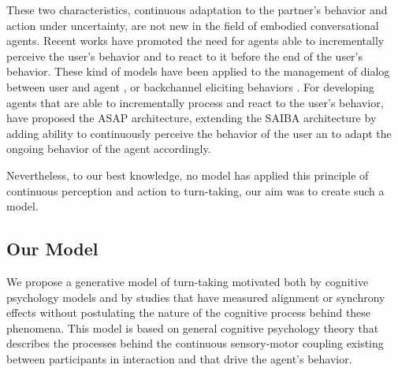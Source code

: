  These two characteristics, continuous adaptation to the partner's behavior and action under uncertainty, are not new in the field of embodied conversational agents. Recent works have promoted the need for agents able to incrementally perceive the user's behavior and to react to it before the end of the user's behavior. These kind of models have been applied to the management of dialog between user and agent \cite{skantze_towards_2010}, or backchannel eliciting behaviors \cite{buschmeier_when_2014}. For developing agents that are able to incrementally process and react to the user's behavior, \cite{kopp_architecture_2014} have proposed the ASAP architecture, extending the SAIBA architecture by adding ability to continuously perceive the behavior of the user an to adapt the ongoing behavior of the agent accordingly. 
 
 Nevertheless, to our best knowledge, no model has applied this principle of continuous perception and action to turn-taking, our aim was to create such a model. 

\subsection{Our Model}

We propose a generative model of turn-taking motivated both by cognitive psychology models and by studies
that have measured alignment or synchrony effects without postulating the nature of the cognitive process
behind these phenomena. This model is based on general cognitive psychology theory that describes the
processes behind the continuous sensory-motor coupling existing between participants in interaction and that
drive the agent's behavior.



